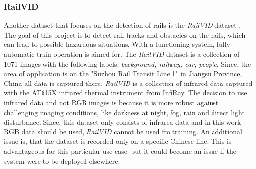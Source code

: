 \subsubsection{RailVID}
\label{subsubsec:railVID}
Another dataset that focuses on the detection of rails is the \textit{RailVID} dataset \cite{yuan2022railvid}. The goal of this project is to detect rail tracks and obstacles on the rails, which can lead to possible hazardous situations. With a functioning system, fully automatic train operation is aimed for. The \textit{RailVID} dataset is a collection of 1071 images with the following labels: \textit{background, railway, car, people}. Since, the area of application is on the "Suzhou Rail Transit Line 1" in Jiangsu Province, China all data is captured there. \textit{RailVID} is a collection of infrared data captured with the AT615X infrared thermal instrument from InfiRay. The decision to use infrared data and not RGB images is because it is more robust against challenging imaging conditions, like darkness at night, fog, rain and direct light disturbance.
Since, this dataset only consists of infrared data and in this work \ac{RGB} data should be used, \textit{RailVID} cannot be used fro training. An additional issue is, that the dataset is recorded only on a specific Chinese line. This is advantageous for this particular use case, but it could become an issue if the system were to be deployed elsewhere.

